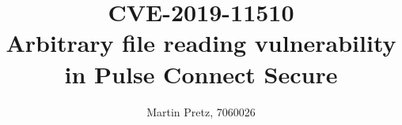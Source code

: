 \documentclass[a4paper,10pt,twocolumn]{article}
\begin{document}

\author{Martin Pretz, 7060026}
\title{\huge CVE-2019-11510 \\ \small Arbitrary file reading vulnerability in Pulse Connect Secure}
\maketitle








\clearpage
\small
\onecolumn
\printbibliography
\end{document}

